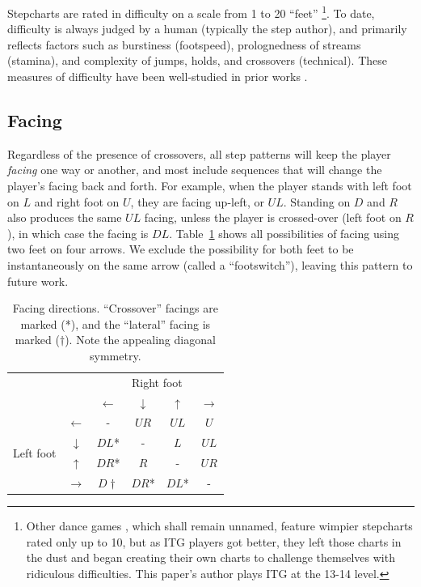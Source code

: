 \documentclass[10pt]{sigplanconf}
\begin{document}
Stepcharts are rated in difficulty on a scale from 1 to 20 ``feet'' \cite{simplylove}\footnote{
Other dance games \cite{konami}, which shall remain unnamed, feature wimpier stepcharts rated only up to 10, but as ITG players got better, they left those charts in the dust and began creating their own charts to challenge themselves with ridiculous difficulties. This paper's author plays ITG at the 13-14 level.}.
To date, difficulty is always judged by a human (typically the step author), and primarily reflects factors such as burstiness (footspeed), prolognedness of streams (stamina), and complexity of jumps, holds, and crossovers (technical).
These measures of difficulty have been well-studied in prior works \cite{callofthehound,dawgsinthehouse}.

\subsection{Facing}

Regardless of the presence of crossovers, all step patterns will keep the player {\em facing} one way or another, and most include sequences that will change the player's facing back and forth.
For example, when the player stands with left foot on $L$ and right foot on $U$, they are facing up-left, or $UL$. Standing on $D$ and $R$ also produces the same $UL$ facing, unless the player is crossed-over (left foot on $R$), in which case the facing is $DL$.
Table~\ref{tab:facing} shows all possibilities of facing using two feet on four arrows.
We exclude the possibility for both feet to be instantaneously on the same arrow (called a ``footswitch''), leaving this pattern to future work.

\begin{table}[h]
	\begin{center}
	\begin{tabular}{cc|cccc}
		& & \multicolumn{4}{c}{Right foot} \\
		& & $\leftarrow$ & $\downarrow$ & $\uparrow$ & $\rightarrow$ \\
		\hline
		\multirow{4}{*}{Left foot}
		& $\leftarrow$  & - & $UR$ & $UL$ & $U$ \\
		& $\downarrow$  & $DL$* & - & $L$ & $UL$ \\
		& $\uparrow$    & $DR$* & $R$ & - & $UR$ \\
		& $\rightarrow$ & $D\dagger$ & $DR$* & $DL$* & - \\

	\end{tabular}
	\end{center}
	\caption{Facing directions. ``Crossover'' facings are marked (*), and the ``lateral'' facing is marked ($\dagger$). Note the appealing diagonal symmetry.}
	\label{tab:facing}
\end{table}
\end{document}
